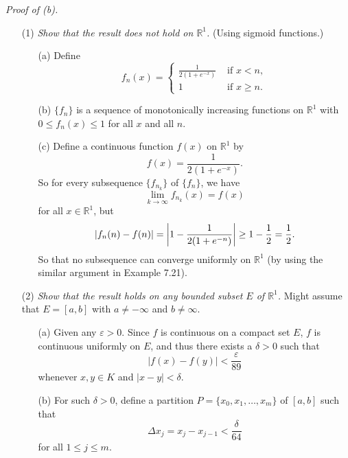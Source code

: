 \documentclass{article}
\begin{document}
\emph{Proof of (b).}
\begin{enumerate}
\item[(1)]
  \emph{Show that the result does not hold on $\mathbb{R}^1$.}
  (Using sigmoid functions.)
  \begin{enumerate}
  \item[(a)]
    Define
    \begin{equation*}
    f_n(x) =
      \begin{cases}
        \frac{1}{2(1+e^{-x})} & \text{ if $x < n$}, \\
        1 & \text{ if $x \geq n$}.
      \end{cases}
    \end{equation*}

  \item[(b)]
    $\{f_n\}$ is a sequence of monotonically increasing functions on $\mathbb{R}^1$
    with $0 \leq f_n(x) \leq 1$ for all $x$ and all $n$.

  \item[(c)]
    Define a continuous function $f(x)$ on $\mathbb{R}^1$ by
    \[
      f(x) = \frac{1}{2(1+e^{-x})}.
    \]
    So for every subsequence $\{f_{n_k}\}$ of $\{f_n\}$, we have
    \[
      \lim_{k \to \infty} f_{n_k}(x) = f(x)
    \]
    for all $x \in \mathbb{R}^1$, but
    \[
      \abs{ f_{n}(n) - f(n) }
      = \abs{ 1 - \frac{1}{2(1+e^{-n})} }
      \geq 1 - \frac{1}{2}
      = \frac{1}{2}.
    \]
    So that no subsequence can converge uniformly on $\mathbb{R}^1$
    (by using the similar argument in Example 7.21).
  \end{enumerate}

\item[(2)]
  \emph{Show that the result holds on any bounded subset $E$ of $\mathbb{R}^1$.}
  Might assume that $E = [a,b]$ with $a \neq -\infty$ and $b \neq \infty$.
  \begin{enumerate}
  \item[(a)]
    Given any $\varepsilon > 0$.
    Since $f$ is continuous on a compact set $E$,
    $f$ is continuous uniformly on $E$,
    and thus there exists a $\delta > 0$ such that
    \[
      |f(x) - f(y)| < \frac{\varepsilon}{89}
    \]
    whenever $x,y \in K$ and $|x-y| < \delta$.

  \item[(b)]
    For such $\delta > 0$,
    define a partition $P = \{x_0, x_1, \ldots, x_m\}$ of $[a,b]$ such that
    \[
      \Delta x_j = x_j - x_{j-1} < \frac{\delta}{64}
    \]
    for all $1 \leq j \leq m$.


\end{enumerate}
\end{enumerate}
\end{document}
